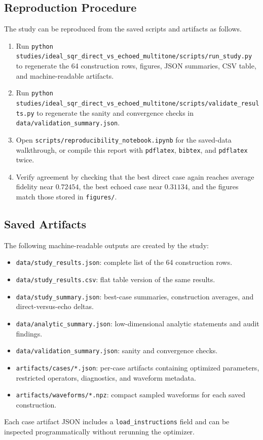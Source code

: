 \documentclass[aps,pra,twocolumn,reprint,floatfix,amsmath,amssymb]{revtex4-2}
\begin{document}
\subsection{Reproduction Procedure}
The study can be reproduced from the saved scripts and artifacts as follows.
\begin{enumerate}
  \item Run \texttt{python studies/ideal\_sqr\_direct\_vs\_echoed\_multitone/scripts/run\_study.py} to regenerate the 64 construction rows, figures, JSON summaries, CSV table, and machine-readable artifacts.
  \item Run \texttt{python studies/ideal\_sqr\_direct\_vs\_echoed\_multitone/scripts/validate\_results.py} to regenerate the sanity and convergence checks in \texttt{data/validation\_summary.json}.
  \item Open \texttt{scripts/reproducibility\_notebook.ipynb} for the saved-data walkthrough, or compile this report with \texttt{pdflatex}, \texttt{bibtex}, and \texttt{pdflatex} twice.
  \item Verify agreement by checking that the best direct case again reaches average fidelity near $0.72454$, the best echoed case near $0.31134$, and the figures match those stored in \texttt{figures/}.
\end{enumerate}

\subsection{Saved Artifacts}
The following machine-readable outputs are created by the study:
\begin{itemize}
  \item \texttt{data/study\_results.json}: complete list of the 64 construction rows.
  \item \texttt{data/study\_results.csv}: flat table version of the same results.
  \item \texttt{data/study\_summary.json}: best-case summaries, construction averages, and direct-versus-echo deltas.
  \item \texttt{data/analytic\_summary.json}: low-dimensional analytic statements and audit findings.
  \item \texttt{data/validation\_summary.json}: sanity and convergence checks.
  \item \texttt{artifacts/cases/*.json}: per-case artifacts containing optimized parameters, restricted operators, diagnostics, and waveform metadata.
  \item \texttt{artifacts/waveforms/*.npz}: compact sampled waveforms for each saved construction.
\end{itemize}
Each case artifact JSON includes a \texttt{load\_instructions} field and can be inspected programmatically without rerunning the optimizer.
\end{document}
